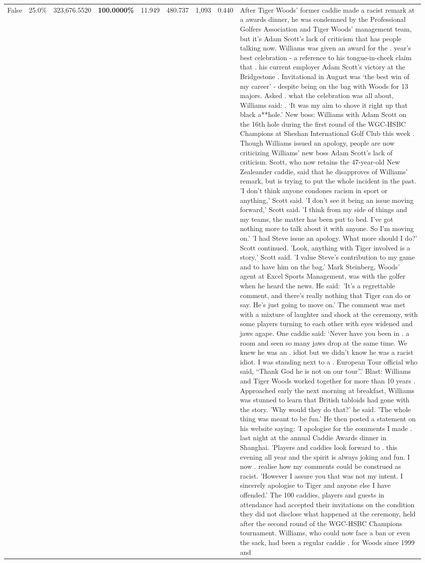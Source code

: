 \begin{table}[H]
\begin{tabular}{lllrlllll}
False & 25.0\% & 323,676.5520 & \bfseries \color{red} 100.0000\% & 11.949 & 480.737 & 1,093 & 0.440 & After Tiger Woods' former caddie made a racist remark at a awards dinner, he was condemned by the Professional Golfers Association and Tiger Woods' management team, but it's Adam Scott's lack of criticism that has people talking now. Williams was given an award for the . year’s best celebration - a reference to his tongue-in-cheek claim that . his current employer Adam Scott’s victory at the Bridgestone . Invitational in August was ‘the best win of my career’ - despite being on the bag with Woods for 13 majors. Asked . what the celebration was all about, Williams said: . ‘It was my aim to shove it right up that black a**hole.’ New boss: Williams with Adam Scott  on the 16th hole during the first round of the WGC-HSBC Champions at Sheshan International Golf Club this week . Though Williams issued an apology, people are now criticizing Williams' new boss Adam Scott's lack of criticism. Scott, who now retains the 47-year-old New Zealeander caddie, said that he disapproves of Williams' remark, but is trying to put the whole incident in the past. 'I don't think anyone condones racism in sport or anything,' Scott said. 'I don't see it being an issue moving forward,' Scott said. 'I think from my side of things and my teams, the matter has been put to bed. I've got nothing more to talk about it with anyone. So I'm moving on.' 'I had Steve issue an apology. What more should I do?' Scott continued. 'Look, anything with Tiger involved is a story,' Scott said. 'I value Steve's contribution to my game and to have him on the bag.' Mark Steinberg, Woods' agent at Excel Sports Management, was with the golfer when he heard the news. He said: 'It's a regrettable comment, and there's really nothing that Tiger can do or say. He's just going to move on.' The comment was met with a mixture of laughter and shock at the ceremony, with some players turning to each other with eyes widened and jaws agape. One caddie said: ‘Never have you been in . a room and seen so many jaws drop at the same time. We knew he was an . idiot but we didn’t know he was a racist idiot. I was standing next to a . European Tour official who said, “Thank God he is not on our tour”.’ Blast: Williams and Tiger Woods worked together for more than 10 years . Approached early the next morning at breakfast, Williams was stunned to learn that British tabloids had gone with the story. 'Why would they do that?' he said. 'The whole thing was meant to be fun.' He then posted a statement on his website saying: 'I apologise for the comments I made . last night at the annual Caddie Awards dinner in Shanghai. 'Players and caddies look forward to . this evening all year and the spirit is always joking and fun. I now . realise how my comments could be construed as racist. 'However I assure you that was not my intent. I sincerely apologise to Tiger and anyone else I have offended.' The 100 caddies, players and guests in attendance had accepted their invitations on the condition they did not disclose what happened at the ceremony, held after the second round of the WGC-HSBC Champions tournament. Williams, who could now face a ban or even the sack, had been a regular caddie . for Woods since 1999 and 
\end{tabular}
\end{table}
